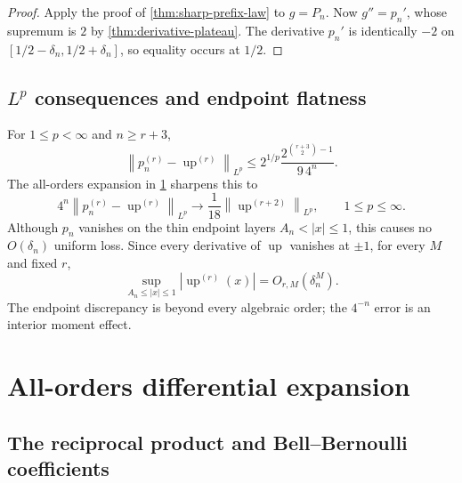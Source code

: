 \documentclass[11pt]{article}
\theoremstyle{definition}
\theoremstyle{remark}
\newcommand{\Up}{\operatorname{up}}
\newcommand{\norm}[1]{\left\lVert #1\right\rVert}
\begin{document}
\begin{proof}
Apply the proof of \cref{thm:sharp-prefix-law} to $g=P_n$.  Now
$g''=p_n'$, whose supremum is $2$ by \cref{thm:derivative-plateau}.  The derivative
$p_n'$ is identically $-2$ on
$[1/2-\delta_n,1/2+\delta_n]$, so equality occurs at $1/2$.
\end{proof}

\subsection{$L^p$ consequences and endpoint flatness}

For $1\le p<\infty$ and $n\ge r+3$,
\begin{equation}
 \norm{p_n^{(r)}-\Up^{(r)}}_{L^p}
 \le 2^{1/p}\frac{2^{\binom{r+3}{2}-1}}{9\,4^n}.
 \label{eq:lp-upper}
\end{equation}
The all-orders expansion in \cref{sec:all-orders} sharpens this to
\begin{equation}
 4^n\norm{p_n^{(r)}-\Up^{(r)}}_{L^p}
 \longrightarrow \frac1{18}\norm{\Up^{(r+2)}}_{L^p},
 \qquad 1\le p\le\infty.
 \label{eq:lp-asymptotic}
\end{equation}
Although $p_n$ vanishes on the thin endpoint layers
$A_n<|x|\le1$, this causes no $O(\delta_n)$ uniform loss.  Since every derivative of
$\Up$ vanishes at $\pm1$, for every $M$ and fixed $r$,
\begin{equation}
 \sup_{A_n\le|x|\le1}|\Up^{(r)}(x)|=O_{r,M}(\delta_n^M).
 \label{eq:endpoint-superalgebraic}
\end{equation}
The endpoint discrepancy is beyond every algebraic order; the $4^{-n}$ error is an
interior moment effect.

\section{All-orders differential expansion}
\label{sec:all-orders}

\subsection{The reciprocal product and Bell--Bernoulli coefficients}
\end{document}
